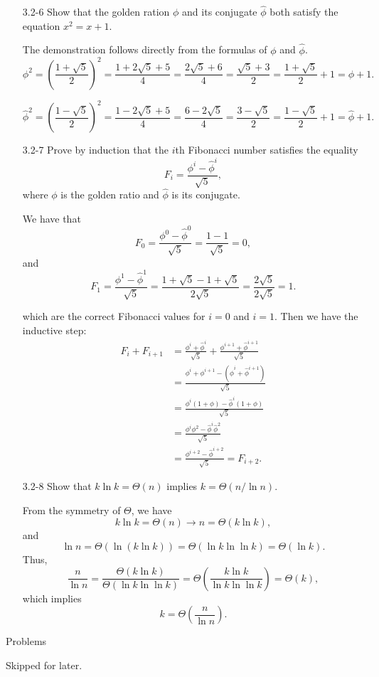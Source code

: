 \documentclass{report}
\makeatletter
\renewenvironment{framed}{%
 \def\FrameCommand##1{\hskip\@totalleftmargin
 \fboxsep=\FrameSep\fbox{##1}}%
 \MakeFramed {\advance\hsize-\width
   \@totalleftmargin\z@ \linewidth\hsize
   \@setminipage}}%
 {\par\unskip\endMakeFramed}
\makeatother
\begin{document}
\begin{enumerate}
\item[3.2{-}6]{Show that the golden ration $\phi$ and its conjugate $\hat\phi$}
both satisfy the equation $x^2 = x + 1$.

\begin{framed}
The demonstration follows directly from the formulas of $\phi$ and $\hat\phi$.
\[
\phi^2 = \left(\frac{1 + \sqrt{5}}{2}\right)^2 = \frac{1 + 2 \sqrt{5} + 5}{4}
       = \frac{2 \sqrt{5} + 6}{4} = \frac{\sqrt{5} + 3}{2}
       = \frac{1 + \sqrt{5}}{2} + 1 = \phi + 1.
\]

\[
\hat\phi^2 = \left(\frac{1 - \sqrt{5}}{2}\right)^2 = \frac{1 - 2 \sqrt{5} + 5}{4}
           = \frac{6 - 2 \sqrt{5}}{4} = \frac{3 - \sqrt{5}}{2}
           = \frac{1 - \sqrt{5}}{2} + 1 = \hat\phi + 1.
\]
\end{framed}

\item[3.2{-}7]{Prove by induction that the $i$th Fibonacci number satisfies the
equality
\[
F_i = \frac{\phi^i - \hat\phi^i}{\sqrt{5}},
\]
where $\phi$ is the golden ratio and $\hat\phi$ is its conjugate.
}

\begin{framed}
We have that
\[
F_0 = \frac{\phi^0 - \hat\phi^0}{\sqrt{5}} = \frac{1 - 1}{\sqrt{5}} = 0,
\]
and
\[
F_1 = \frac{\phi^1 - \hat\phi^1}{\sqrt{5}}
    = \frac{1 + \sqrt{5} - 1 + \sqrt{5}}{2 \sqrt{5}}
    = \frac{2 \sqrt{5}}{2 \sqrt{5}} = 1.
\]

which are the correct Fibonacci values for $i = 0$ and $i = 1$. Then we have the inductive step:
\begin{equation*}
\begin{split}
F_i + F_{i + 1} &= \frac{\phi^i + \hat\phi^i}{\sqrt{5}} +
                   \frac{\phi^{i + 1} + \hat\phi^{i + 1}}{\sqrt{5}}\\
                &= \frac{\phi^i + \phi^{i + 1} - (\hat\phi^i + \hat\phi^{i + 1})}{\sqrt{5}}\\
                &= \frac{\phi^i (1 + \phi) - \hat\phi^i (1 + \phi)}{\sqrt{5}}\\
                &= \frac{\phi^i \phi^2 - \hat\phi^i \hat\phi^2}{\sqrt{5}}\\
                &= \frac{\phi^{i + 2} - \hat\phi^{i + 2}}{\sqrt{5}} = F_{i + 2}.
\end{split}
\end{equation*}
\end{framed}

\item[3.2{-}8]{Show that $k \ln k = \Theta(n)$ implies $k = \Theta(n / \ln n)$.}

\begin{framed}
From the symmetry of $\Theta$, we have
\[
k \ln k = \Theta(n) \rightarrow n = \Theta(k \ln k),
\]
and
\[
\ln n = \Theta(\ln(k \ln k)) = \Theta(\ln k \ln \ln k) = \Theta(\ln k).
\]
Thus,
\[
\frac{n}{\ln n} = \frac{\Theta(k \ln k)}{\Theta(\ln k \ln \ln k)}
                = \Theta\left(\frac{k \ln k}{\ln k \ln \ln k}\right)
                = \Theta(k),
\]
which implies
\[
k = \Theta\left(\frac{n}{\ln n}\right).
\]
\end{framed}

\end{enumerate}

\newpage

{\large Problems}

\vspace{0.8em}
Skipped for later.
\end{document}
